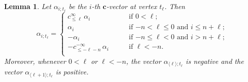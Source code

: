 \documentclass[12pt]{amsart}
\newcommand{\bfc}{\mathbf{c}}
\newcommand{\cv}{\alpha}
\renewcommand{\mod}[1]{\langle {#1} \rangle}
\newcommand{\Zidx}{\ell}
\newtheorem{lemma}[theorem]{Lemma}
\theoremstyle{remark}
\numberwithin{equation}{section}
\numberwithin{figure}{section}
\begin{document}
\begin{lemma}
  \label{lemma:c-vectors}
  Let $\cv_{i;t_\Zidx}$ be the $i$-th $\bfc$-vector at vertex $t_\Zidx$.
  Then
  \begin{equation}\label{eq:c-vectors}
    \cv_{i;t_\Zidx}
    =
    \begin{cases}
      c^\infty_{\le\Zidx}\, \alpha_i & \text{if $0<\Zidx$;}\\
      \alpha_i & \text{if $-n < \Zidx \leq 0$ and  $i\leq n+\Zidx$;} \\
      -\alpha_i & \text{if $-n\leq \Zidx < 0$ and $i > n+\Zidx$;} \\
      -c^{-\infty}_{\le-\Zidx-n}\, \alpha_i \qquad & \text{if $\Zidx<-n$.}\\
    \end{cases}
  \end{equation}
  Moreover, whenever $0 < \Zidx$ or $\Zidx < -n$, the vector $\cv_{\mod{\Zidx};t_\Zidx}$ is negative and the vector $\cv_{\mod{\Zidx+1};t_\Zidx}$ is positive.
\end{lemma}
\end{document}

